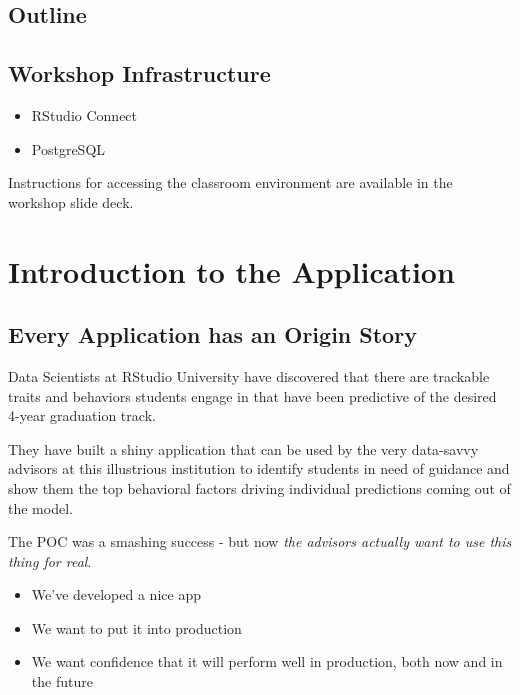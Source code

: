 \documentclass[]{book}
\providecommand{\tightlist}{%
  \setlength{\itemsep}{0pt}\setlength{\parskip}{0pt}}
\begin{document}
\hypertarget{outline}{%
\section{Outline}\label{outline}}

\hypertarget{workshop-infrastructure}{%
\section{Workshop Infrastructure}\label{workshop-infrastructure}}

\begin{itemize}
\tightlist
\item
  RStudio Connect
\item
  PostgreSQL
\end{itemize}

Instructions for accessing the classroom environment are available in
the workshop slide deck.

\hypertarget{app-intro}{%
\chapter{Introduction to the Application}\label{app-intro}}

\hypertarget{every-application-has-an-origin-story}{%
\section{Every Application has an Origin
Story}\label{every-application-has-an-origin-story}}

Data Scientists at RStudio University have discovered that there are
trackable traits and behaviors students engage in that have been
predictive of the desired 4-year graduation track.

They have built a shiny application that can be used by the very
data-savvy advisors at this illustrious institution to identify students
in need of guidance and show them the top behavioral factors driving
individual predictions coming out of the model.

The POC was a smashing success - but now \emph{the advisors actually
want to use this thing for real}.

\begin{itemize}
\tightlist
\item
  We've developed a nice app
\item
  We want to put it into production
\item
  We want confidence that it will perform well in production, both now
  and in the future
\end{itemize}
\end{document}
